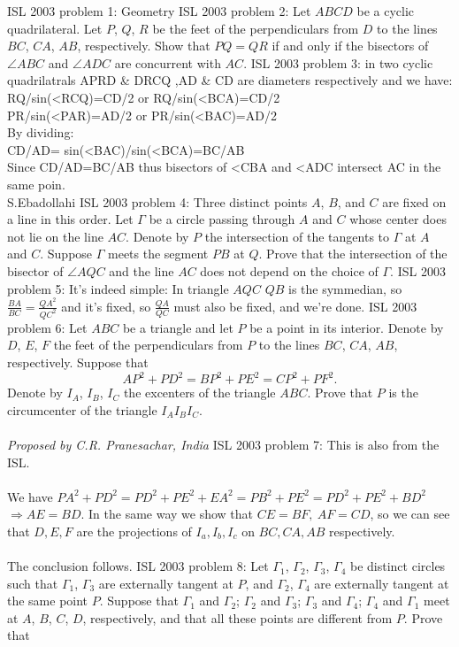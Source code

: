 ISL 2003 problem 1:  Geometry 
ISL 2003 problem 2:  Let $ABCD$ be a cyclic quadrilateral. Let $P$, $Q$, $R$ be the feet of the perpendiculars from $D$ to the lines $BC$, $CA$, $AB$, respectively. Show that $PQ=QR$ if and only if the bisectors of $\angle ABC$ and $\angle ADC$ are concurrent with $AC$. 
ISL 2003 problem 3:  in two cyclic quadrilatrals APRD \& DRCQ ,AD \& CD are diameters respectively and  we have: \\
RQ/sin(<RCQ)=CD/2 or RQ/sin(<BCA)=CD/2 \\
PR/sin(<PAR)=AD/2 or PR/sin(<BAC)=AD/2 \\
By dividing: \\
CD/AD= sin(<BAC)/sin(<BCA)=BC/AB \\
Since CD/AD=BC/AB thus bisectors of <CBA and <ADC intersect AC in the same poin. \\
S.Ebadollahi 
ISL 2003 problem 4:  Three distinct points $A$, $B$, and $C$ are fixed on a line in this order.  Let $\Gamma$ be a circle passing through $A$ and $C$ whose center does not lie on the line $AC$.  Denote by $P$ the intersection of the tangents to $\Gamma$ at $A$ and $C$.  Suppose $\Gamma$ meets the segment $PB$ at $Q$.  Prove that the intersection of the bisector of $\angle AQC$ and the line $AC$ does not depend on the choice of $\Gamma$. 
ISL 2003 problem 5:  It's indeed simple: In triangle $AQC$ $QB$ is the symmedian, so $\frac{BA}{BC}=\frac{QA^2}{QC^2}$ and it's fixed, so $\frac{QA}{QC}$ must also be fixed, and we're done. 
ISL 2003 problem 6:  Let $ABC$ be a triangle and let $P$ be a point in its interior.  Denote by $D$, $E$, $F$ the feet of the perpendiculars from $P$ to the lines $BC$, $CA$, $AB$, respectively.  Suppose that
\[ AP^2 + PD^2 = BP^2 + PE^2 = CP^2 + PF^2. \]
Denote by $I_A$, $I_B$, $I_C$ the excenters of the triangle $ABC$.  Prove that $P$ is the circumcenter of the triangle $I_AI_BI_C$. \\\\
\textit{Proposed by C.R. Pranesachar, India } 
ISL 2003 problem 7:  This is also from the ISL. \\\\
We have $PA^2+PD^2=PD^2+PE^2+EA^2=PB^2+PE^2=PD^2+PE^2+BD^2$ $\Rightarrow AE=BD$. In the same way we show that $CE=BF,\ AF=CD$, so we can see that $D, E, F$ are the projections of $I_a,I_b,I_c$ on $BC,CA,AB$ respectively. \\\\
The conclusion follows. 
ISL 2003 problem 8:  Let $\Gamma_1$, $\Gamma_2$, $\Gamma_3$, $\Gamma_4$ be distinct circles such that $\Gamma_1$, $\Gamma_3$ are externally tangent at $P$, and $\Gamma_2$, $\Gamma_4$ are externally tangent at the same point $P$. Suppose that $\Gamma_1$ and $\Gamma_2$; $\Gamma_2$ and $\Gamma_3$; $\Gamma_3$ and $\Gamma_4$; $\Gamma_4$ and $\Gamma_1$ meet at $A$, $B$, $C$, $D$, respectively, and that all these points are different from $P$. Prove that
